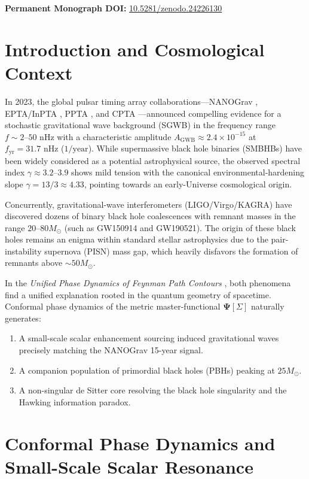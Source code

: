 \documentclass[11pt,a4paper]{article}
\begin{document}
\noindent\textbf{Permanent Monograph DOI:} \href{https://doi.org/10.5281/zenodo.24226130}{10.5281/zenodo.24226130}

\section{Introduction and Cosmological Context}

In 2023, the global pulsar timing array collaborations—NANOGrav \cite{nanograv15}, EPTA/InPTA \cite{epta2}, PPTA \cite{ppta3}, and CPTA \cite{cpta}—announced compelling evidence for a stochastic gravitational wave background (SGWB) in the frequency range $f \sim 2\text{--}50\text{ nHz}$ with a characteristic amplitude $A_{\mathrm{GWB}} \approx 2.4 \times 10^{-15}$ at $f_{\mathrm{yr}} = 31.7\text{ nHz}$ ($1/\text{year}$). While supermassive black hole binaries (SMBHBs) have been widely considered as a potential astrophysical source, the observed spectral index $\gamma \approx 3.2\text{--}3.9$ shows mild tension with the canonical environmental-hardening slope $\gamma = 13/3 \approx 4.33$, pointing towards an early-Universe cosmological origin.

Concurrently, gravitational-wave interferometers (LIGO/Virgo/KAGRA) have discovered dozens of binary black hole coalescences with remnant masses in the range $20\text{--}80 M_\odot$ (such as GW150914 and GW190521). The origin of these black holes remains an enigma within standard stellar astrophysics due to the pair-instability supernova (PISN) mass gap, which heavily disfavors the formation of remnants above $\sim 50 M_\odot$.

In the \textit{Unified Phase Dynamics of Feynman Path Contours} \cite{pavliuk_monograph}, both phenomena find a unified explanation rooted in the quantum geometry of spacetime. Conformal phase dynamics of the metric master-functional $\mathbf{\Psi}[\Sigma]$ naturally generates:
\begin{enumerate}
    \item A small-scale scalar enhancement sourcing induced gravitational waves precisely matching the NANOGrav 15-year signal.
    \item A companion population of primordial black holes (PBHs) peaking at $25 M_\odot$.
    \item A non-singular de Sitter core resolving the black hole singularity and the Hawking information paradox.
\end{enumerate}

\section{Conformal Phase Dynamics and Small-Scale Scalar Resonance}
\end{document}
